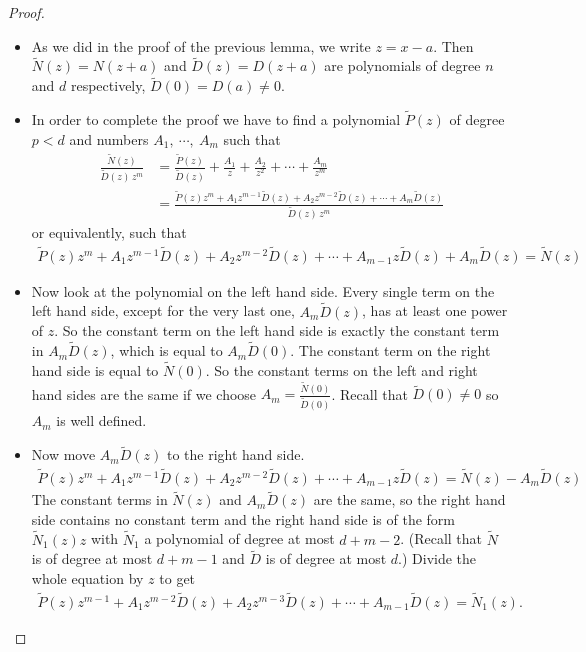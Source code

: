 \begin{proof}
\begin{itemize}
 \item As we did in the proof of the previous lemma, we write $z=x-a$. Then $\tilde
N(z)=N(z+a)$ and $\tilde D(z)=D(z+a)$ are polynomials of degree $n$ and $d$ respectively,
$\tilde D(0)=D(a)\ne 0$.

\item In order to complete the proof we have to find a polynomial
$\tilde P(z)$ of degree $p<d$  and numbers $A_1,\ \cdots,\ A_m$ such that
\begin{align*}
\frac{\tilde N(z)}{\tilde D(z)\,z^m}
&=\frac{\tilde P(z)}{\tilde D(z)}+\frac{A_1}{z}+\frac{A_2}{z^2}+\cdots
+\frac{A_m}{z^m}\\
&=\frac{\tilde P(z) z^m+A_1z^{m-1}\tilde D(z)+A_2z^{m-2}\tilde
D(z)+\cdots+A_m\tilde D(z)}{\tilde D(z)\,z^m}
\end{align*}
or equivalently, such that
\begin{align*}
\tilde P(z) z^m+A_1z^{m-1}\tilde D(z)+A_2z^{m-2}\tilde D(z)+\cdots
+A_{m-1}z\tilde D(z)+A_m\tilde D(z)
=\tilde N(z)
\end{align*}

\item Now look at the polynomial on the left hand side. Every single term on
the left hand side, except for the very last one, $A_m\tilde D(z)$,
has at least one power of $z$. So the constant term on the left hand
side is exactly the constant term in $A_m\tilde D(z)$, which is equal to
$A_m\tilde D(0)$. The constant term on the right hand side is equal to $\tilde N(0)$.
So the constant terms on the left and right hand sides are the same if
we choose $A_m=\frac{\tilde N(0)}{\tilde D(0)}$. Recall that
$\tilde D(0)\ne 0$ so $A_m$ is well defined.
\item Now move $A_m\tilde D(z)$ to the right hand side.
\begin{align*}
\tilde P(z) z^m+A_1z^{m-1}\tilde D(z)+A_2z^{m-2}\tilde D(z)+\cdots
+A_{m-1}z\tilde D(z)
=\tilde N(z)-A_m\tilde D(z)
\end{align*}
The constant terms in $\tilde N(z)$ and $A_m\tilde D(z)$ are the same,
so the right hand side contains no constant term and the right
hand side is of the form $\tilde N_1(z) z$ with $\tilde N_1$ a polynomial
of degree at most $d+m-2$. (Recall that $\tilde N$ is of degree at most
$d+m-1$ and $\tilde D$ is of degree at most $d$.) Divide the whole equation by $z$ to get
\begin{align*}
\tilde P(z) z^{m-1}+A_1z^{m-2}\tilde D(z)+A_2z^{m-3}\tilde D(z)+\cdots
+A_{m-1}\tilde D(z)
=\tilde N_1(z).
\end{align*}


\end{itemize}
\end{proof}
